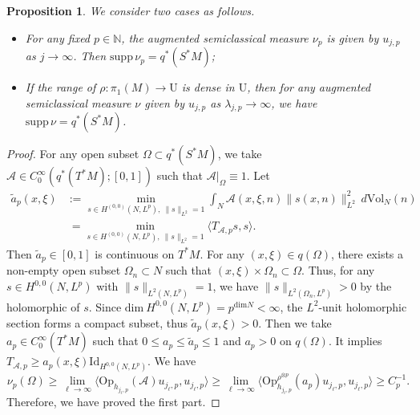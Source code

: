 \documentclass[11pt,oneside,reqno]{amsart}
\newtheorem{proposition}[theorem]{Proposition}
\theoremstyle{definition}
\numberwithin{equation}{section}
\theoremstyle{plain}
\begin{document}
\begin{proposition}
We consider two cases as follows.
\begin{itemize}
\item For any fixed $p\in \mathbb{N}$, the augmented semiclassical measure $\nu_{p}$ is given by $u_{j,p}$ as $j\to \infty$. Then $\mathrm{supp}\,\nu_p=q^*(S^*M)$;
\item If the range of $\rho:\pi_{1}(M)\to \mathrm{U}$ is dense in $\mathrm{U}$, then for any augmented semiclassical measure $\nu$ given by $u_{j,p}$ as $\lambda_{j,p}\to \infty$, we have $\mathrm{supp}\,\nu=q^*(S^*M)$.
\end{itemize}
\end{proposition}
\begin{proof}
For any open subset $\Omega\subset q^*(S^*M)$, we take $\mathcal{A} \in C_{0}^{\infty}(q^*(T^*M);[0,1])$ such that $\mathcal{A}|_{\Omega}\equiv 1$. Let 
\begin{equation*}
    \begin{aligned}
        \widetilde{a}_p(x,\xi) &:=\min_{s \in H^{(0,0)}(N,L^p), \ \|s\|_{L^2}=1}\int_{N}\mathcal{A}(x,\xi,n)\|s(x,n)\|_{L^2}^2 \,d\mathrm{Vol}_{N}(n) \\
        &\ =\min_{s \in H^{(0,0)}(N,L^p), \ \|s\|_{L^2}=1}\langle T_{\mathcal{A},p}s,s\rangle.
    \end{aligned}
\end{equation*}
Then $\widetilde{a}_p\in [0,1]$ is continuous on $T^*M$. For any $(x,\xi)\in q(\Omega)$, there exists a non-empty open subset $\Omega_{n}\subset N$ such that $(x,\xi)\times \Omega_{n}\subset \Omega$. Thus, for any $s \in H^{0,0}(N,L^{p})$ with $\|s\|_{L^2(N,L^p)}=1$, we have $\|s\|_{L^2(\Omega_n,L^p)}>0$ by the holomorphic of $s$. Since $\mathrm{dim} \ H^{0,0}(N,L^{p})=p^{\mathrm{dim} N}<\infty$, the $L^2$-unit holomorphic section forms a compact subset, thus $\widetilde{a}_p(x,\xi)>0$. Then we take $a_p \in C_{0}^{\infty}(T^*M)$ such that $0\leq a_p\leq \widetilde{a}_p\leq 1$ and $a_p>0$ on $q(\Omega)$. It implies $T_{\mathcal{A},p}\geq a_p(x,\xi)\mathrm{Id}_{H^{0,0}(N,L^p)}$. We have
\begin{equation}
\nu_p(\Omega)\geq\lim_{\ell\to \infty}\langle \mathrm{Op}_{h_{j_\ell,p}}(\mathcal{A})u_{j_\ell,p},u_{j_\ell,p}\rangle\geq\lim_{\ell\to \infty}\langle \mathrm{Op}_{h_{j_\ell,p}}^{\rho^{\otimes p}}(a_p)u_{j_\ell,p},u_{j_\ell,p}\rangle\geq C^{-1}_p.
\end{equation}
Therefore, we have proved the first part.


\end{proof}
\end{document}
